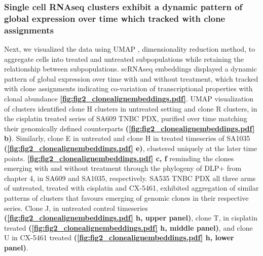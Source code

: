 \subsubsection{Single cell RNAseq clusters exhibit a dynamic pattern of global expression over time which tracked with clone assignments}
Next, we visualized the data using UMAP \cite{becht2019dimensionality}, dimensionality reduction method, to aggregate cells into treated and untreated subpopulations while retaining the relationship between subpopulations. scRNAseq embeddings displayed a dynamic pattern of global expression over time with and without treatment, which tracked with clone assignments indicating co-variation of transcriptional properties with clonal abundance \textbf{\autoref{fig:fig2_clonealignembeddings.pdf}}. UMAP visualization of clusters identified clone H clusters in untreated setting and clone R clusters, in the cisplatin treated series of SA609 TNBC PDX, purified over time matching their genomically defined counterparts \textbf{(\autoref{fig:fig2_clonealignembeddings.pdf} b)}. Similarly, clone E in untreated and clone H in treated timeseries of SA1035  \textbf{(\autoref{fig:fig2_clonealignembeddings.pdf} e)}, clustered uniquely at the later time points. \textbf{\autoref{fig:fig2_clonealignembeddings.pdf} c, f} reminding the clones emerging with and without treatment through the phylogeny of DLP+ from chapter 4, in SA609 and SA1035, respectively.  SA535 TNBC PDX all three arms of untreated, treated with cisplatin and CX-5461, exhibited aggregation of similar patterns of clusters that favours emerging of genomic clones in their respective series. Clone J, in untreated control timeseries \textbf{(\autoref{fig:fig2_clonealignembeddings.pdf} h, upper panel)}, clone T, in cisplatin treated \textbf{(\autoref{fig:fig2_clonealignembeddings.pdf} h, middle panel)}, and clone U in CX-5461 treated \textbf{(\autoref{fig:fig2_clonealignembeddings.pdf} h, lower panel)}.





